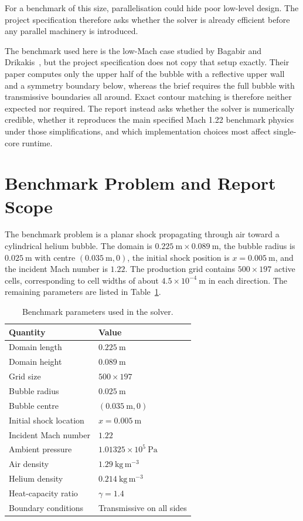 \documentclass[final,3p,times,twocolumn]{elsarticle}
\begin{document}
For a benchmark of this size, parallelisation could hide poor low-level design. The project specification therefore asks whether the solver is already efficient before any parallel machinery is introduced.

The benchmark used here is the low-Mach case studied by Bagabir and Drikakis~\cite{bagabir2001}, but the project specification does not copy that setup exactly. Their paper computes only the upper half of the bubble with a reflective upper wall and a symmetry boundary below, whereas the brief requires the full bubble with transmissive boundaries all around. Exact contour matching is therefore neither expected nor required. The report instead asks whether the solver is numerically credible, whether it reproduces the main specified Mach 1.22 benchmark physics under those simplifications, and which implementation choices most affect single-core runtime.

\section{Benchmark Problem and Report Scope}

The benchmark problem is a planar shock propagating through air toward a cylindrical helium bubble. The domain is $0.225~\mathrm{m} \times 0.089~\mathrm{m}$, the bubble radius is $0.025~\mathrm{m}$ with centre $(0.035~\mathrm{m},0)$, the initial shock position is $x = 0.005~\mathrm{m}$, and the incident Mach number is $1.22$. The production grid contains $500 \times 197$ active cells, corresponding to cell widths of about $4.5 \times 10^{-4}~\mathrm{m}$ in each direction. The remaining parameters are listed in Table~\ref{tab:benchmark}.

\begin{table}[t]
\centering
\caption{Benchmark parameters used in the solver.}
\label{tab:benchmark}
\begin{tabular}{ll}
\toprule
Quantity & Value \\
\midrule
Domain length & $0.225~\mathrm{m}$ \\
Domain height & $0.089~\mathrm{m}$ \\
Grid size & $500 \times 197$ \\
Bubble radius & $0.025~\mathrm{m}$ \\
Bubble centre & $(0.035~\mathrm{m}, 0)$ \\
Initial shock location & $x = 0.005~\mathrm{m}$ \\
Incident Mach number & $1.22$ \\
Ambient pressure & $1.01325 \times 10^5~\mathrm{Pa}$ \\
Air density & $1.29~\mathrm{kg\,m^{-3}}$ \\
Helium density & $0.214~\mathrm{kg\,m^{-3}}$ \\
Heat-capacity ratio & $\gamma = 1.4$ \\
Boundary conditions & Transmissive on all sides \\
\bottomrule
\end{tabular}
\end{table}
\end{document}
